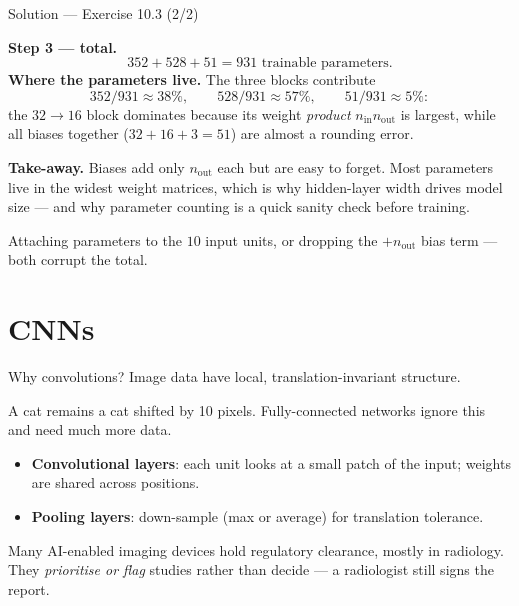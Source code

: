 \documentclass[aspectratio=169,11pt]{beamer}
\begin{document}
\begin{frame}{Solution --- Exercise 10.3 (2/2)}
\begin{solutionbox}
  \textbf{Step 3 --- total.}
  \[
    352 + 528 + 51 = \boxed{931} \text{ trainable parameters.}
  \]
  \textbf{Where the parameters live.} The three blocks contribute
  \[
    352/931 \approx 38\%, \qquad 528/931 \approx 57\%, \qquad 51/931 \approx 5\%:
  \]
  the $32 \to 16$ block dominates because its weight \emph{product}
  $n_{\text{in}} n_{\text{out}}$ is largest, while all biases together
  ($32 + 16 + 3 = 51$) are almost a rounding error.

  \medskip
  \textbf{Take-away.} Biases add only $n_{\text{out}}$ each but are
  easy to forget. Most parameters live in the widest weight matrices,
  which is why hidden-layer width drives model size --- and why parameter
  counting is a quick sanity check before training.

\end{solutionbox}
\begin{mistake}
  Attaching parameters to the $10$ input units, or dropping the
  $+n_{\text{out}}$ bias term --- both corrupt the total.
\end{mistake}
\end{frame}

\section{CNNs}

\begin{frame}{Why convolutions?}
  Image data have local, translation-invariant structure.
  \begin{takeaway}
    A cat remains a cat shifted by 10 pixels. Fully-connected networks
    ignore this and need much more data.
  \end{takeaway}
  \begin{readme}
    \begin{itemize}
      \item \textbf{Convolutional layers}: each unit looks at a small
            patch of the input; weights are shared across positions.
      \item \textbf{Pooling layers}: down-sample (max or average) for
            translation tolerance.
    \end{itemize}
  \end{readme}
  \begin{industry}
    Many AI-enabled imaging devices hold regulatory clearance, mostly in radiology. They
    \emph{prioritise or flag} studies rather than decide --- a radiologist still signs the
    report.
  \end{industry}
\end{frame}
\end{document}
